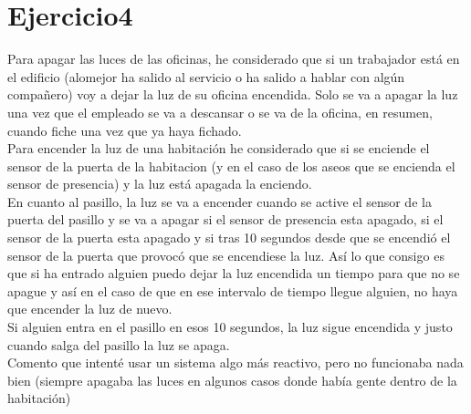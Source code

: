 \documentclass[10pt,spanish]{article}
\begin{document}
	\section{Ejercicio4}
	Para apagar las luces de las oficinas, he considerado que si un trabajador está en el edificio (alomejor ha salido al servicio o ha salido a hablar con algún compañero) voy a dejar la luz de
	su oficina encendida. Solo se va a apagar la luz una vez que el empleado se va a descansar o se va de la oficina, en resumen, cuando fiche una vez que ya haya fichado.\\
	Para encender la luz de una habitación he considerado que si se enciende el sensor de la puerta de la habitacion (y en el caso de los aseos que se encienda el sensor de presencia) y la luz está apagada
	la enciendo. \\
	En cuanto al pasillo, la luz se va a encender cuando se active el sensor de la puerta del pasillo y se va a apagar si el sensor de presencia esta apagado, si el sensor de la puerta esta apagado y si tras 10 segundos desde que se encendió el sensor de la puerta que provocó que se encendiese la luz.
	Así lo que consigo es que si ha entrado alguien puedo dejar la luz encendida un tiempo para que no se apague y así en el caso de que en ese intervalo de tiempo llegue alguien, no haya que encender la luz de nuevo.\\
	Si alguien entra en el pasillo en esos 10 segundos, la luz sigue encendida y justo cuando salga del pasillo la luz se apaga.\\
	Comento que intenté usar un sistema algo más reactivo, pero no funcionaba nada bien (siempre apagaba las luces en algunos casos donde había gente dentro de la habitación)
\end{document}
